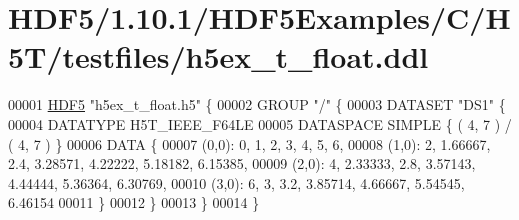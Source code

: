 \hypertarget{_h_d_f5_21_810_81_2_h_d_f5_examples_2_c_2_h5_t_2testfiles_2h5ex__t__float_8ddl_source}{}\section{H\+D\+F5/1.10.1/\+H\+D\+F5\+Examples/\+C/\+H5\+T/testfiles/h5ex\+\_\+t\+\_\+float.ddl}
\label{_h_d_f5_21_810_81_2_h_d_f5_examples_2_c_2_h5_t_2testfiles_2h5ex__t__float_8ddl_source}

\begin{DoxyCode}
00001 \hyperlink{namespace_h_d_f5}{HDF5} \textcolor{stringliteral}{"h5ex\_t\_float.h5"} \{
00002 GROUP \textcolor{stringliteral}{"/"} \{
00003    DATASET \textcolor{stringliteral}{"DS1"} \{
00004       DATATYPE  H5T\_IEEE\_F64LE
00005       DATASPACE  SIMPLE \{ ( 4, 7 ) / ( 4, 7 ) \}
00006       DATA \{
00007       (0,0): 0, 1, 2, 3, 4, 5, 6,
00008       (1,0): 2, 1.66667, 2.4, 3.28571, 4.22222, 5.18182, 6.15385,
00009       (2,0): 4, 2.33333, 2.8, 3.57143, 4.44444, 5.36364, 6.30769,
00010       (3,0): 6, 3, 3.2, 3.85714, 4.66667, 5.54545, 6.46154
00011       \}
00012    \}
00013 \}
00014 \}
\end{DoxyCode}
